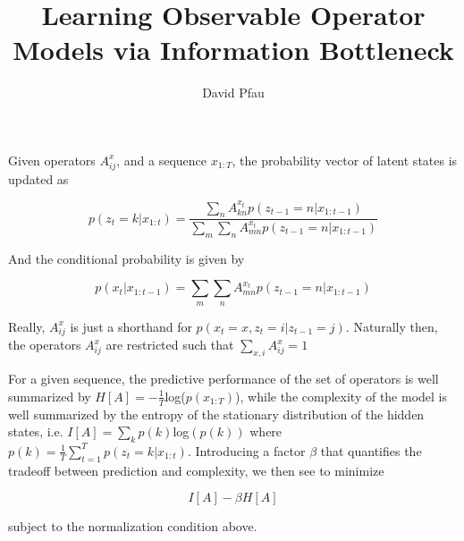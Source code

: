 \documentclass[11pt]{article}
\title{Learning Observable Operator Models via Information Bottleneck}
\author{David Pfau}
\begin{document}
\maketitle

Given operators $A^x_{ij}$, and a sequence $x_{1:T}$, the probability vector of latent states is updated as

\[
p(z_t = k|x_{1:t}) = \frac{\sum_n A^{x_t}_{kn} p(z_{t-1}=n|x_{1:t-1})}{\sum_m\sum_n A^{x_t}_{mn} p(z_{t-1}=n|x_{1:t-1})}
\]

And the conditional probability is given by 

\[
p(x_t|x_{1:t-1}) = \sum_m\sum_n A^{x_t}_{mn} p(z_{t-1}=n|x_{1:t-1})
\]

Really, $A^x_{ij}$ is just a shorthand for $p(x_t = x, z_t = i | z_{t-1} = j)$.  Naturally then, the operators $A^x_{ij}$ are restricted such that $\displaystyle\sum_{x,i}A^x_{ij}= 1$

For a given sequence, the predictive performance of the set of operators is well summarized by $H[A] = -\frac{1}{T}$log($p(x_{1:T})$), while the complexity of the model is well summarized by the entropy of the stationary distribution of the hidden states, i.e. $I[A] = \sum_k p(k)$log$(p(k))$ where $p(k) = \frac{1}{T}\displaystyle\sum_{t = 1}^T p(z_t=k|x_{1:t})$.  Introducing a factor $\beta$ that quantifies the tradeoff between prediction and complexity, we then see to minimize 

\[
I[A] - \beta H[A]
\]

subject to the normalization condition above.
\end{document}
